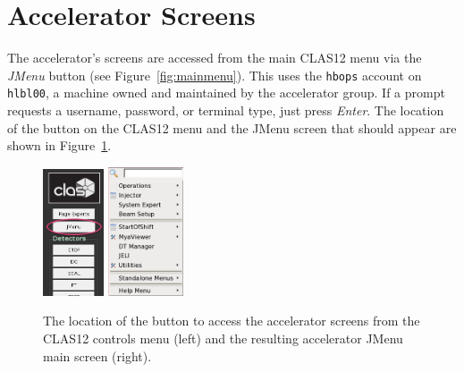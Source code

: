 \documentclass[amsmath,amssymb,notitlepage,11pt]{revtex4}
\begin{document}
\section{Accelerator Screens}
The accelerator's screens are accessed from the main CLAS12 menu via the {\em JMenu} button (see Figure~\ref{fig:mainmenu}).  This uses the \texttt{hbops} account on \texttt{hlbl00}, a machine owned and maintained by the accelerator group.  If a prompt requests a username, password, or terminal type, just press {\em Enter}.  The location of the button on the CLAS12 menu and the JMenu screen that should appear are shown in Figure~\ref{fig:jmenu}.
\begin{figure}[htbp]\centering
  \includegraphics[width=0.16\textwidth]{pics/clas12jmenu}
  \includegraphics[width=0.2\textwidth]{pics/jmenu}
  \caption{The location of the button to access the accelerator screens from the CLAS12 controls menu (left) and the resulting accelerator JMenu main screen (right).\label{fig:jmenu}}
\end{figure}
\newpage
\end{document}
